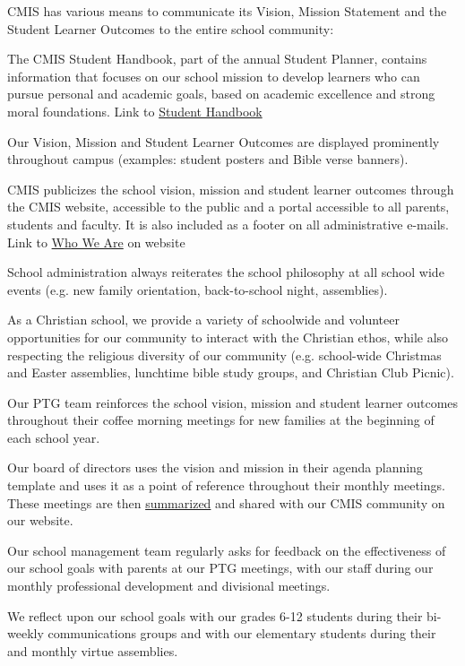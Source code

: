 \begin{findings}
CMIS has various means to communicate its Vision, Mission Statement and the Student Learner Outcomes to the entire school community:

The CMIS Student Handbook, part of the annual Student Planner, contains information that focuses on our school mission to develop learners who can pursue personal and academic goals, based on academic excellence and strong moral foundations. Link to \href{https://docs.google.com/document/d/1bIbV9pgGz2vpXYJdnRzL_Od5PS35egy7lgBOBuszgD4/edit}{Student Handbook}

Our Vision, Mission and Student Learner Outcomes are displayed prominently throughout campus (examples: student posters and Bible verse banners). 

CMIS publicizes the school vision, mission and student learner outcomes through the CMIS website, accessible to the public and a portal accessible to all parents, students and faculty. It is also included as a footer on all administrative e-mails.  Link to \href{http://cmis.ac.th/about/vision}{Who We Are} on website

School administration always reiterates the school philosophy at all school wide events (e.g. new family orientation, back-to-school night, assemblies). 

As a Christian school, we provide a variety of schoolwide and volunteer opportunities for our community to interact with the Christian ethos, while also respecting the religious diversity of our community (e.g. school-wide Christmas and Easter assemblies, lunchtime bible study groups, and Christian Club Picnic).

Our PTG team reinforces the school vision, mission and student learner outcomes throughout their coffee morning meetings for new families at the beginning of each school year. 

Our board of directors uses the vision and mission in their agenda planning template and uses it as a point of reference throughout their monthly meetings. These meetings are then \href{http://blogs.cmis.ac.th/ptg/public-board-minutes/}{summarized} and shared with our CMIS community on our website.

Our school management team regularly asks for feedback on the effectiveness of our school goals with parents at our PTG meetings, with our staff during our monthly professional development and divisional meetings.

We reflect upon our school goals with our grades 6-12 students during their bi-weekly communications groups and with our elementary students during their and monthly virtue assemblies.


\end{findings}
